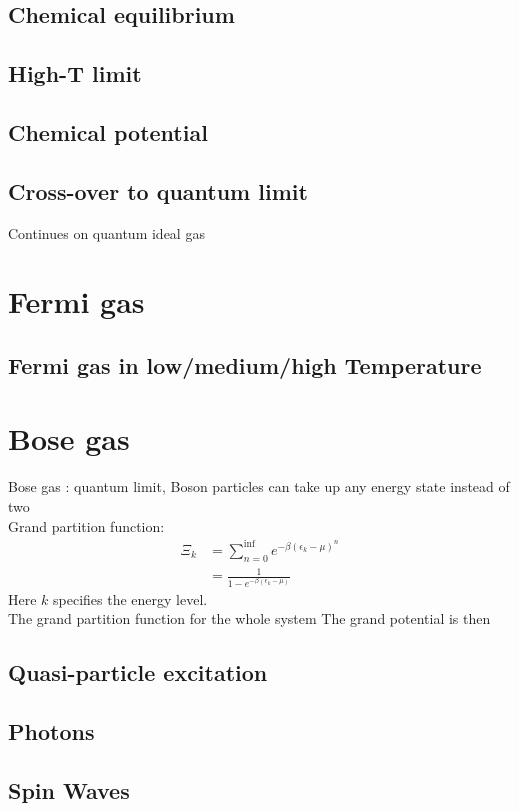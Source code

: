 \documentclass[12pt,a4paper]{article}
\begin{document}

\subsection{Chemical equilibrium}
\subsection{High-T limit}
\subsection{Chemical potential}

\subsection{Cross-over to quantum limit}
Continues on quantum ideal gas
\section{Fermi gas}
\subsection{Fermi gas in low/medium/high Temperature}
\section{Bose gas}
    Bose gas : quantum limit, Boson particles can take up any energy state instead of two\\
    Grand partition function:
    \begin{align*}
    \Xi_k   &= \sum_{n=0}^{\inf} e^{-\beta(\epsilon_k-\mu)^n}\\
            &=\frac{1}{1-e^{-\beta(\epsilon_k-\mu)}}
    \end{align*}
    Here $k$ specifies the energy level.\\
    The grand partition function for the whole system
    The grand potential is then
\subsection{Quasi-particle excitation}
\subsection{Photons}
\subsection{Spin Waves}
\end{document}
